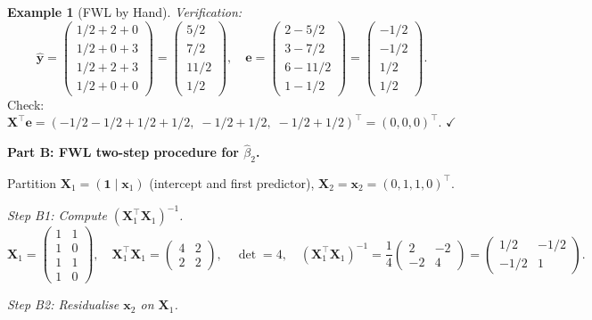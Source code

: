 \documentclass[11pt,a4paper]{article}
\theoremstyle{plain}
\theoremstyle{definition}
\newtheorem{example}[theorem]{Example}
\newcommand{\yhat}{\hat{\bm{y}}}
\newcommand{\bX}{\bm{X}}
\newcommand{\be}{\bm{e}}
\begin{document}
\begin{example}[FWL by Hand]
\emph{Verification:}
\[
\yhat = \begin{pmatrix}1/2+2+0\\1/2+0+3\\1/2+2+3\\1/2+0+0\end{pmatrix}
= \begin{pmatrix}5/2\\7/2\\11/2\\1/2\end{pmatrix},\quad
\be = \begin{pmatrix}2-5/2\\3-7/2\\6-11/2\\1-1/2\end{pmatrix}
= \begin{pmatrix}-1/2\\-1/2\\1/2\\1/2\end{pmatrix}.
\]
Check: $\bX^\top\be = (-1/2-1/2+1/2+1/2,\;-1/2+1/2,\;-1/2+1/2)^\top = (0,0,0)^\top$. $\checkmark$

\medskip\noindent\textbf{Part B: FWL two-step procedure for $\hat\beta_2$.}

Partition $\bX_1 = (\bm{1}\mid \bm{x}_1)$ (intercept and first predictor),
$\bX_2 = \bm{x}_2 = (0,1,1,0)^\top$.

\emph{Step B1: Compute $(\bX_1^\top\bX_1)^{-1}$.}
\[
\bX_1 = \begin{pmatrix}1&1\\1&0\\1&1\\1&0\end{pmatrix},\quad
\bX_1^\top\bX_1 = \begin{pmatrix}4&2\\2&2\end{pmatrix},\quad
\det=4,\quad
(\bX_1^\top\bX_1)^{-1} = \frac{1}{4}\begin{pmatrix}2&-2\\-2&4\end{pmatrix}
= \begin{pmatrix}1/2&-1/2\\-1/2&1\end{pmatrix}.
\]

\emph{Step B2: Residualise $\bm{x}_2$ on $\bX_1$.}


\end{example}
\end{document}
